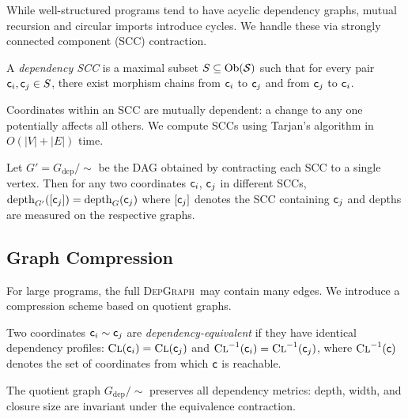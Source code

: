 \documentclass[11pt]{article}
\newcommand{\DepGraph}{\textsc{DepGraph}}
\newcommand{\DepDepth}{\mathrm{depth}}
\begin{document}
While well-structured programs tend to have acyclic dependency graphs,
mutual recursion and circular imports introduce cycles.  We handle these
via strongly connected component (SCC) contraction.

\begin{definition}\label{def:dep-scc}
A \emph{dependency SCC} is a maximal subset $S \subseteq \mathrm{Ob}(\mathcal{S})$ such
that for every pair $\mathsf{c}_i, \mathsf{c}_j \in S$, there exist morphism chains
from $\mathsf{c}_i$ to $\mathsf{c}_j$ and from $\mathsf{c}_j$ to $\mathsf{c}_i$.
\end{definition}

Coordinates within an SCC are mutually dependent: a change to any one
potentially affects all others.  We compute SCCs using Tarjan's algorithm
in $O(|V| + |E|)$ time.

\begin{proposition}\label{prop:scc-depth}
Let $G' = G_{\mathrm{dep}} / {\sim}$ be the DAG obtained by contracting
each SCC to a single vertex.  Then for any two coordinates $\mathsf{c}_i$,
$\mathsf{c}_j$ in different SCCs,
$\DepDepth_{G'}([\coord_j]) = \DepDepth_G(\coord_j)$
where $[\mathsf{c}_j]$ denotes the SCC containing $\mathsf{c}_j$ and depths are
measured on the respective graphs.
\end{proposition}

\subsection{Graph Compression}\label{sec:graph-compression}

For large programs, the full \DepGraph\ may contain many edges.  We
introduce a compression scheme based on quotient graphs.

\begin{definition}\label{def:dep-equiv}
Two coordinates $\mathsf{c}_i \sim \mathsf{c}_j$ are \emph{dependency-equivalent}
if they have identical dependency profiles: $\textsc{Cl}(\mathsf{c}_i) =
\textsc{Cl}(\mathsf{c}_j)$ and $\textsc{Cl}^{-1}(\mathsf{c}_i) =
\textsc{Cl}^{-1}(\mathsf{c}_j)$, where $\textsc{Cl}^{-1}(\mathsf{c})$ denotes
the set of coordinates from which $\mathsf{c}$ is reachable.
\end{definition}

\begin{proposition}\label{prop:quotient-sound}
The quotient graph $G_{\mathrm{dep}} / {\sim}$ preserves all dependency
metrics: depth, width, and closure size are invariant under the equivalence
contraction.
\end{proposition}
\end{document}
